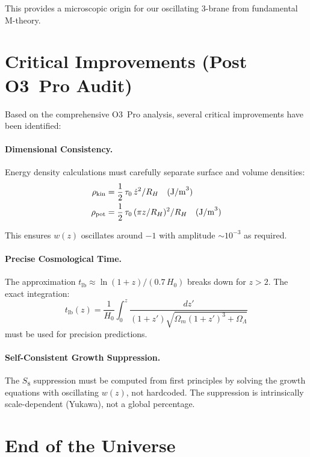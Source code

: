 This provides a microscopic origin for our oscillating 3-brane from fundamental M-theory.

\section{Critical Improvements (Post O3~Pro Audit)}
\label{sec:o3_improvements}

Based on the comprehensive O3~Pro analysis, several critical improvements have been identified:

\paragraph{Dimensional Consistency.}
Energy density calculations must carefully separate surface and volume densities:
\begin{align}
\rho_\text{kin} &= \frac{1}{2}\,\tau_0\,\dot{z}^2/R_H \quad \text{(J/m}^3\text{)} \\
\rho_\text{pot} &= \frac{1}{2}\,\tau_0\,(\pi z/R_H)^2/R_H \quad \text{(J/m}^3\text{)}
\end{align}

This ensures $w(z)$ oscillates around $-1$ with amplitude $\sim 10^{-3}$ as required.

\paragraph{Precise Cosmological Time.}
The approximation $t_\text{lb} \approx \ln(1+z)/(0.7\,H_0)$ breaks down for $z > 2$. The exact integration:
\begin{equation}
t_\text{lb}(z) = \frac{1}{H_0}\int_0^z \frac{dz'}{(1+z')\sqrt{\Omega_m(1+z')^3 + \Omega_\Lambda}}
\end{equation}
must be used for precision predictions.

\paragraph{Self-Consistent Growth Suppression.}
The $S_8$ suppression must be computed from first principles by solving the growth equations with oscillating $w(z)$, not hardcoded. The suppression is intrinsically scale-dependent (Yukawa), not a global percentage.

\section{End of the Universe}
\label{sec:end_universe}

